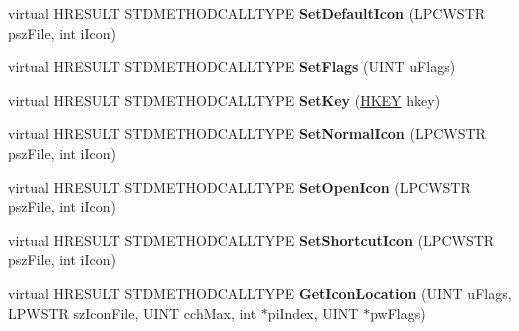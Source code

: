 \begin{DoxyCompactItemize}
\item 
\mbox{\label{class_c_extract_icon_a9b0865315ccc72ea30b63af5057fdf5a}} 
virtual H\+R\+E\+S\+U\+LT S\+T\+D\+M\+E\+T\+H\+O\+D\+C\+A\+L\+L\+T\+Y\+PE {\bfseries Set\+Default\+Icon} (L\+P\+C\+W\+S\+TR psz\+File, int i\+Icon)
\item 
\mbox{\label{class_c_extract_icon_a07a924b3703b8bff03a4d2f4f6cf88ee}} 
virtual H\+R\+E\+S\+U\+LT S\+T\+D\+M\+E\+T\+H\+O\+D\+C\+A\+L\+L\+T\+Y\+PE {\bfseries Set\+Flags} (U\+I\+NT u\+Flags)
\item 
\mbox{\label{class_c_extract_icon_af66de5f3d382da30afe23eb2f4e2b7ee}} 
virtual H\+R\+E\+S\+U\+LT S\+T\+D\+M\+E\+T\+H\+O\+D\+C\+A\+L\+L\+T\+Y\+PE {\bfseries Set\+Key} (\hyperlink{interfacevoid}{H\+K\+EY} hkey)
\item 
\mbox{\label{class_c_extract_icon_a92329d69869d1c1d8e3da966b8973bb0}} 
virtual H\+R\+E\+S\+U\+LT S\+T\+D\+M\+E\+T\+H\+O\+D\+C\+A\+L\+L\+T\+Y\+PE {\bfseries Set\+Normal\+Icon} (L\+P\+C\+W\+S\+TR psz\+File, int i\+Icon)
\item 
\mbox{\label{class_c_extract_icon_a9848378d84af803f22ee549a85ebc894}} 
virtual H\+R\+E\+S\+U\+LT S\+T\+D\+M\+E\+T\+H\+O\+D\+C\+A\+L\+L\+T\+Y\+PE {\bfseries Set\+Open\+Icon} (L\+P\+C\+W\+S\+TR psz\+File, int i\+Icon)
\item 
\mbox{\label{class_c_extract_icon_a640579cd51344b9be9810c79c516b827}} 
virtual H\+R\+E\+S\+U\+LT S\+T\+D\+M\+E\+T\+H\+O\+D\+C\+A\+L\+L\+T\+Y\+PE {\bfseries Set\+Shortcut\+Icon} (L\+P\+C\+W\+S\+TR psz\+File, int i\+Icon)
\item 
\mbox{\label{class_c_extract_icon_ab033dd6af6cf0d0206fcedab63767845}} 
virtual H\+R\+E\+S\+U\+LT S\+T\+D\+M\+E\+T\+H\+O\+D\+C\+A\+L\+L\+T\+Y\+PE {\bfseries Get\+Icon\+Location} (U\+I\+NT u\+Flags, L\+P\+W\+S\+TR sz\+Icon\+File, U\+I\+NT cch\+Max, int $\ast$pi\+Index, U\+I\+NT $\ast$pw\+Flags)
\item 
\mbox{\label{class_c_extract_icon_a776d1427d17f9a5b5fb3881cfcd219cd}} 

\end{DoxyCompactItemize}
